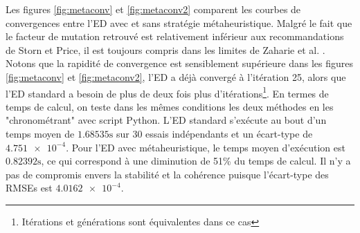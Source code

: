 Les figures \ref{fig:metaconv} et \ref{fig:metaconv2} comparent les courbes de convergences entre l'ED avec et sans stratégie métaheuristique. Malgré le fait que le facteur de mutation retrouvé est relativement inférieur aux recommandations de Storn et Price, il est toujours compris dans les limites de Zaharie et al. \cite{Zaharie2002}. Notons que la rapidité de convergence est sensiblement supérieure dans les figures \ref{fig:metaconv} et \ref{fig:metaconv2}, l'ED a déjà convergé à l'itération 25, alors que l'ED standard a besoin de plus de deux fois plus d'itérations\footnote{Itérations et générations sont équivalentes dans ce cas}. En termes de temps de calcul, on teste dans les mêmes conditions les deux méthodes en les "chronométrant" avec script Python. L'ED standard s'exécute au bout d'un temps moyen de $1.68535 \si{\second}$ sur 30 essais indépendants et un écart-type de $\num{4.751e-4}$. Pour l'ED avec métaheuristique, le temps moyen d'exécution est $0.82392 \si{\second}$, ce qui correspond à une diminution de 51\% du temps de calcul. Il n'y a pas de compromis envers la stabilité et la cohérence puisque l'écart-type des RMSEs est $\num{4.0162e-4}$. 
